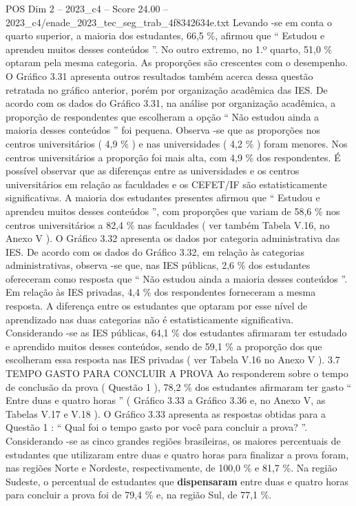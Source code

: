 \begin{textsample}{POS Dim 2 – 2023\_c4 – Score 24.00 – 2023\_c4/enade\_2023\_tec\_seg\_trab\_4f8342634e.txt}
Levando -se em conta o quarto superior, a maioria dos estudantes, 66,5 \%, afirmou que “ Estudou e aprendeu muitos desses conteúdos ”.
No outro extremo, no 1.º quarto, 51,0 \% optaram pela mesma categoria.
As proporções são crescentes com o desempenho.
O Gráfico 3.31 apresenta outros resultados também acerca dessa questão retratada no gráfico anterior, porém por organização acadêmica das IES.
De acordo com os dados do Gráfico 3.31, na análise por organização acadêmica, a proporção de respondentes que escolheram a opção “ Não estudou ainda a maioria desses conteúdos ” foi pequena.
Observa -se que as proporções nos centros universitários ( 4,9 \% ) e nas universidades ( 4,2 \% ) foram menores.
Nos centros universitários a proporção foi mais alta, com 4,9 \% dos respondentes.
É possível observar que as diferenças entre as universidades e os centros universitários em relação as faculdades e os CEFET/IF são estatisticamente significativas.
A maioria dos estudantes presentes afirmou que “ Estudou e aprendeu muitos desses conteúdos ”, com proporções que variam de 58,6 \% nos centros universitários a 82,4 \% nas faculdades ( ver também Tabela V.16, no Anexo V ).
O Gráfico 3.32 apresenta os dados por categoria administrativa das IES.
De acordo com os dados do Gráfico 3.32, em relação às categorias administrativas, observa -se que, nas IES públicas, 2,6 \% dos estudantes ofereceram como resposta que “ Não estudou ainda a maioria desses conteúdos ”.
Em relação às IES privadas, 4,4 \% dos respondentes forneceram a mesma resposta.
A diferença entre os estudantes que optaram por esse nível de aprendizado nas duas categorias não é estatisticamente significativa.
Considerando -se as IES públicas, 64,1 \% dos estudantes afirmaram ter estudado e aprendido muitos desses conteúdos, sendo de 59,1 \% a proporção dos que escolheram essa resposta nas IES privadas ( ver Tabela V.16 no Anexo V ). 3.7 TEMPO GASTO PARA CONCLUIR A PROVA Ao responderem sobre o tempo de conclusão da prova ( Questão 1 ), 78,2 \% dos estudantes afirmaram ter gasto “ Entre duas e quatro horas ” ( Gráfico 3.33 a Gráfico 3.36 e, no Anexo V, as Tabelas V.17 e V.18 ).
O Gráfico 3.33 apresenta as respostas obtidas para a Questão 1 : “ Qual foi o tempo gasto por você para concluir a prova? ”.
Considerando -se as cinco grandes regiões brasileiras, os maiores percentuais de estudantes que utilizaram entre duas e quatro horas para finalizar a prova foram, nas regiões Norte e Nordeste, respectivamente, de 100,0 \% e 81,7 \%.
Na região Sudeste, o percentual de estudantes que \textbf{dispensaram} entre duas e quatro horas para concluir a prova foi de 79,4 \% e, na região Sul, de 77,1 \%.

\end{textsample}
